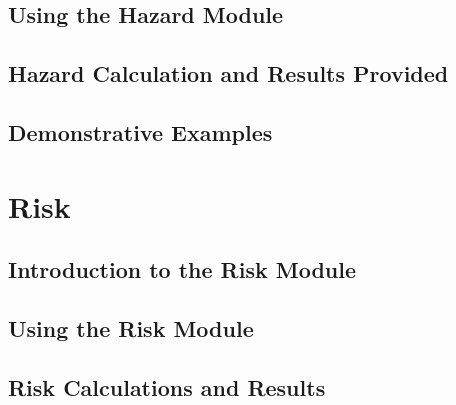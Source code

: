 \documentclass[11pt,fleqn]{book} %
\begin{document}
\chapter{Using the Hazard Module}
	\label{chap:hazinp}
	
   \cleardoublepage

\chapter{Hazard Calculation and Results Provided}
	\label{chap:hazout}
	
   \cleardoublepage

\chapter{Demonstrative Examples}
	\label{chap:hazdemo}
	
   \cleardoublepage

\thispagestyle{empty}
\part{Risk}

\chapter{Introduction to the Risk Module}
   \label{chap:oqriskintro}
	
   \cleardoublepage

\chapter{Using the Risk Module}
	\label{chap:riskmodule}
	
   \cleardoublepage

\chapter{Risk Calculations and Results}
	\label{chap:riskout}
	
   \cleardoublepage
\end{document}
